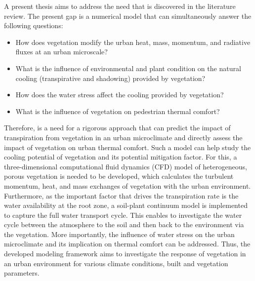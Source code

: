 A present thesis aims to address the need that is discovered in the literature review. The present gap is a numerical model that can simultaneously answer the following questions:
\begin{itemize}
	\item How does vegetation modify the urban heat, mass, momentum, and radiative fluxes at an urban microscale?
	\item What is the influence of environmental and plant condition on the natural cooling (transpirative and shadowing) provided by vegetation?
	\item How does the water stress affect the cooling provided by vegetation?
	\item What is the influence of vegetation on pedestrian thermal comfort?
\end{itemize}

Therefore, is a need for a rigorous approach that can predict the impact of transpiration from vegetation in an urban microclimate and directly assess the impact of vegetation on urban thermal comfort. Such a model can help study the cooling potential of vegetation and its potential mitigation factor. For this, a three-dimensional computational fluid dynamics (CFD) model of heterogeneous, porous vegetation is needed to be developed, which calculates the turbulent momentum, heat, and mass exchanges of vegetation with the urban environment. Furthermore, as the important factor that drives the transpiration rate is the water availability at the root zone, a soil-plant continuum model is implemented to capture the full water transport cycle. This enables to investigate the water cycle between the atmosphere to the soil and then back to the environment via the vegetation. More importantly, the influence of water stress on the urban microclimate and its implication on thermal comfort can be addressed. Thus, the developed modeling framework aims to investigate the response of vegetation in an urban environment for various climate conditions, built and vegetation parameters.
